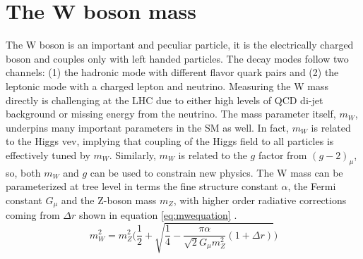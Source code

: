 

\section{The W boson mass}

The W boson is an important and peculiar particle, it is the electrically charged boson and couples only with left handed particles. The decay modes follow two channels: (1) the hadronic mode with different flavor quark pairs and (2) the leptonic mode with a charged lepton and neutrino. Measuring the W mass directly is challenging at the LHC due to either high levels of QCD di-jet background or missing energy from the neutrino. The mass parameter itself, $m_W$, underpins many important parameters in the SM as well. In fact, $m_W$ is related to the Higgs vev, implying that coupling of the Higgs field to all particles is effectively tuned by $m_W$. Similarly, $m_W$ is related to the $g$ factor from $(g-2)_\mu$, so, both $m_W$ and $g$ can be used to constrain new physics. The W mass can be parameterized at tree level in terms the fine structure constant $\alpha$, the Fermi constant $G_\mu$ and the Z-boson mass $m_Z$, with higher order radiative corrections coming from $\Delta r$ shown in equation \ref{eq:mwequation} \cite{Awramik:2003rn}.
\begin{equation}
\label{eq:mwequation}
m_W^2 = m_Z^2\Bigg(\frac{1}{2} + \sqrt{\frac{1}{4} - \frac{\pi\alpha}{\sqrt{2}G_\mu m_{Z}^2 }(1+\Delta r) } \Bigg)
\end{equation}

